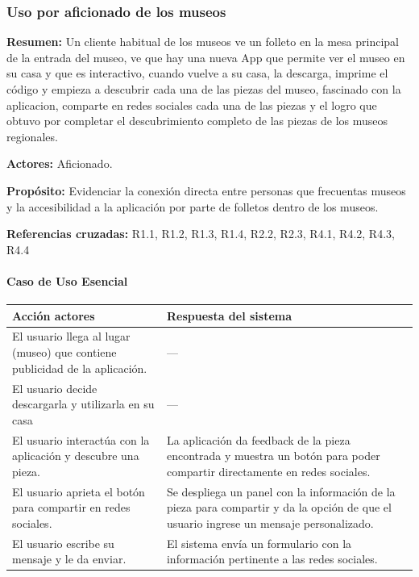 \subsubsection{Uso por aficionado de los museos}

{\textbf {Resumen:}}
Un cliente habitual de los museos ve un folleto en la mesa principal de la entrada del museo, ve que hay una nueva App que permite ver el museo en su casa y que es interactivo, cuando vuelve a su casa, la descarga, imprime el código y empieza a descubrir cada una de las piezas del museo, fascinado con la aplicacion, comparte en redes sociales cada una de las piezas y el logro que obtuvo por completar el descubrimiento completo de las piezas de los museos regionales.

{\textbf {Actores:}}
Aficionado.

{\textbf {Propósito:}}
Evidenciar la conexión directa entre personas que frecuentas museos y la accesibilidad a la aplicación por parte de folletos dentro de los museos.

{\textbf {Referencias cruzadas:}}
R1.1, R1.2, R1.3, R1.4, R2.2, R2.3, R4.1, R4.2, R4.3, R4.4

\paragraph{Caso de Uso Esencial}

\begin{longtable}{|p{5cm}|p{8cm}|}
\hline 
Acción actores & Respuesta del sistema \\ 
\hline 
El usuario llega al lugar (museo) que contiene publicidad de la aplicación. & --- \\ 
\hline 
El usuario decide descargarla y utilizarla en su casa & --- \\ 
\hline
El usuario interactúa con la aplicación y descubre una pieza. & La aplicación da feedback de la pieza encontrada y muestra un botón para poder compartir directamente en redes sociales. \\ 
\hline
El usuario aprieta el botón para compartir en redes sociales. & Se despliega un panel con la información de la pieza para compartir y da la opción de que el usuario ingrese un mensaje personalizado. \\ 
\hline
El usuario escribe su mensaje y le da enviar. & El sistema  envía un formulario con la información pertinente a las redes sociales. \\ 
\hline

\end{longtable}

